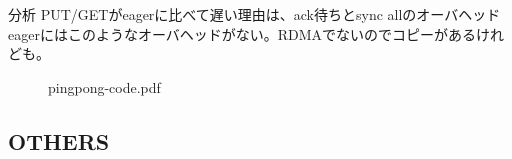 分析
PUT/GETがeagerに比べて遅い理由は、ack待ちとsync allのオーバヘッド
eagerにはこのようなオーバヘッドがない。RDMAでないのでコピーがあるけれども。


\begin{figure}[tbh]
  \begin{center}
    \caption{pingpong-code.pdf}\label{fig:pingpong-code}
  \end{center}
\end{figure}



\subsection{OTHERS}


